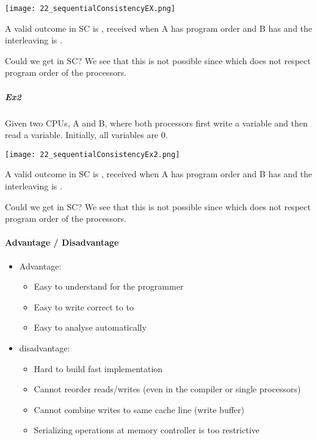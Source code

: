 \texttt{[image: 22\_sequentialConsistencyEX.png]}

A valid outcome in SC is , received when A has program order  and B has  and the interleaving is .

Could we get  in SC? We see that this is not possible since  which does not respect program order of the processors.

\subparagraph{Ex2}
Given two CPUs, A and B, where both processors first write a variable and then read a variable. Initially, all variables are $0$.

\texttt{[image: 22\_sequentialConsistencyEx2.png]}

A valid outcome in SC is , received when A has program order  and B has  and the interleaving is .

Could we get  in SC? We see that this is not possible since  which does not respect program order of the processors.

\paragraph{Advantage / Disadvantage}
\begin{itemize}
    \item Advantage:
        \begin{itemize}
            \item Easy to understand for the programmer
            \item Easy to write correct to to
            \item Easy to analyse automatically
        \end{itemize}
    \item disadvantage:
        \begin{itemize}
            \item Hard to build fast implementation
            \item Cannot reorder reads/writes (even in the compiler or single processors)
            \item Cannot combine writes to same cache line (write buffer)
            \item Serializing operations at memory controller is too restrictive
        \end{itemize}
\end{itemize}

